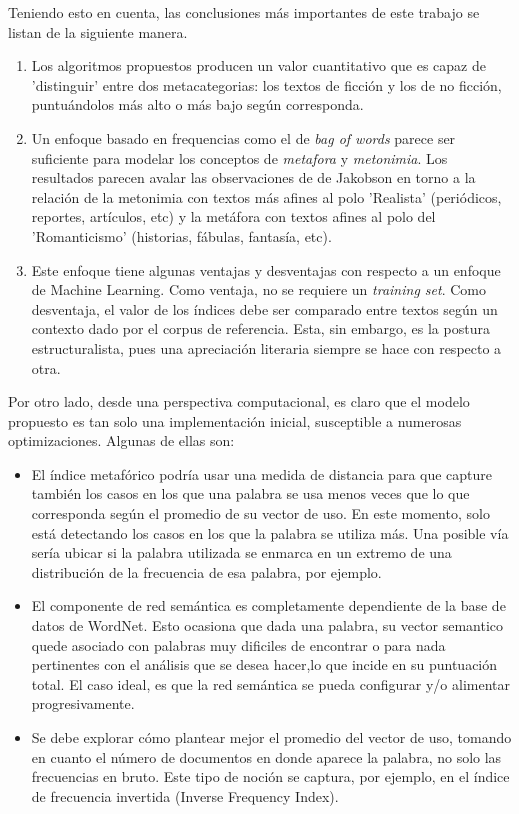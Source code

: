 \documentclass[12pt,letterpaper,twoside]{article}
\begin{document}
Teniendo esto en cuenta, las conclusiones más importantes de este
trabajo se listan de la siguiente manera.


\begin{enumerate}
\item Los algoritmos propuestos producen un valor cuantitativo que es
capaz de 'distinguir' entre dos metacategorias: los textos de
ficción y los de no ficción, puntuándolos más alto o más bajo
según corresponda.

\item Un enfoque basado en frequencias como el de \emph{bag of words} parece
ser suficiente para modelar los conceptos de \emph{metafora} y
\emph{metonimia}.  Los resultados parecen avalar las observaciones de de
Jakobson en torno a la relación de la metonimia con textos más
afines al polo 'Realista' (periódicos, reportes, artículos, etc) y
la metáfora con textos afines al polo del 'Romanticismo'
(historias, fábulas, fantasía, etc).

\item Este enfoque tiene algunas ventajas y desventajas con respecto a un
enfoque de Machine Learning. Como ventaja, no se requiere un
\emph{training set}. Como desventaja, el valor de los índices debe ser
comparado entre textos según un contexto dado por el corpus de
referencia. Esta, sin embargo, es la postura estructuralista, pues
una apreciación literaria siempre se hace con respecto a otra.
\end{enumerate}


Por otro lado, desde una perspectiva computacional, es claro que el
modelo propuesto es tan solo una implementación inicial, susceptible a
numerosas optimizaciones. Algunas de ellas son:

\begin{itemize}
\item El índice metafórico podría usar una medida de distancia para que
capture también los casos en los que una palabra se usa menos veces
que lo que corresponda según el promedio de su vector de uso. En
este momento, solo está detectando los casos en los que la palabra
se utiliza más. Una posible vía sería ubicar si la palabra utilizada
se enmarca en un extremo de una distribución de la frecuencia de esa
palabra, por ejemplo.

\item El componente de red semántica es completamente dependiente de la
base de datos de WordNet. Esto ocasiona que dada una palabra, su
vector semantico quede asociado con palabras muy dificiles de
encontrar o para nada pertinentes con el análisis que se desea
hacer,lo que incide en su puntuación total. El caso ideal, es que la
red semántica se pueda configurar y/o alimentar progresivamente.

\item Se debe explorar cómo plantear mejor el promedio del vector de uso,
tomando en cuanto el número de documentos en donde aparece la
palabra, no solo las frecuencias en bruto. Este tipo de noción se
captura, por ejemplo, en el índice de frecuencia invertida (Inverse
Frequency Index).
\end{itemize}
\end{document}
